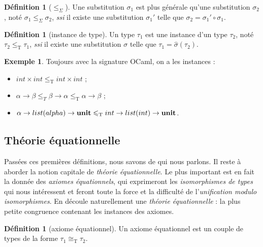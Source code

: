 \documentclass[a4paper]{report}
\theoremstyle{definition}
\newtheorem{definition}[theoreme]{Définition}
\newtheorem{exemple}[theoreme]{Exemple}
\newcommand{\ssi}{\textit{ssi}\xspace}
\newcommand{\unit}{\bold{unit}}
\newcommand{\T}{\mathrm{T}}
\begin{document}
\begin{definition}[$\leqslant_\Sigma$]
	Une substitution $\sigma_1$ est plus générale qu'une substitution $\sigma_2$, noté $\sigma_1 \leqslant_\Sigma \sigma_2$, \ssi il existe une substitution $\sigma_1'$ telle que $\sigma_2 = \sigma_1' \circ \sigma_1$.
\end{definition}

\begin{definition}[instance de type]
	Un type $\tau_1$ est une instance d'un type $\tau_2$, noté $\tau_2 \leqslant_\T \tau_1$, \ssi il existe une substitution $\sigma$ telle que $\tau_1 = \hat\sigma (\tau_2)$.
\end{definition}

\begin{exemple}
	Toujours avec la signature OCaml, on a les instances :
	\begin{itemize}
		\item $int \times int \leqslant_\T int \times int$ ;
		\item $\alpha \rightarrow \beta \leqslant_T \beta \rightarrow \alpha \leqslant_\T \alpha \rightarrow \beta$ ;
		\item $\alpha \rightarrow list (alpha) \rightarrow \unit \leqslant_\T int \rightarrow list (int) \rightarrow \unit$.
	\end{itemize}
\end{exemple}


\subsection{Théorie équationnelle}

Passées ces premières définitions, nous savons de qui nous parlons. Il reste à aborder la notion capitale de \emph{théorie équationnelle}. Le plus important est en fait la donnée des \emph{axiomes équationnels}, qui exprimeront les \emph{isomorphismes de types} qui nous intéressent et feront toute la force et la difficulté de l'\emph{unification modulo isomorphismes}. En découle naturellement une \emph{théorie équationnelle} : la plus petite congruence contenant les instances des axiomes.

\begin{definition}[axiome équationnel]
	Un axiome équationnel est un couple de types de la forme $\tau_1 \cong_\T \tau_2$.
\end{definition}
\end{document}
